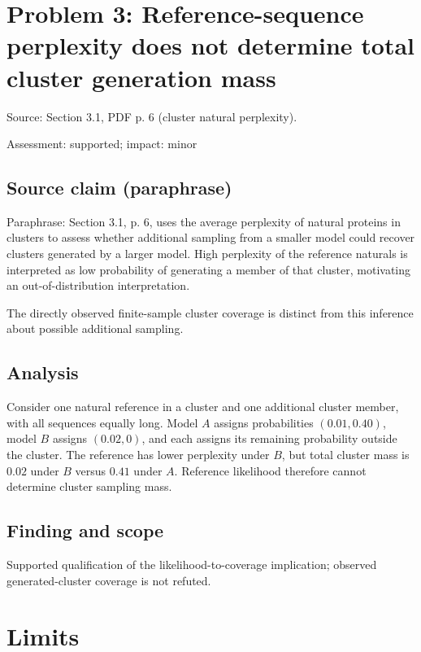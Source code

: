 \documentclass[11pt]{article}
\begin{document}
\section*{Problem 3: Reference-sequence perplexity does not determine total cluster generation mass}

Source: Section 3.1, PDF p. 6 (cluster natural perplexity).

Assessment: supported; impact: minor

\subsection*{Source claim (paraphrase)}

Paraphrase: Section 3.1, p. 6, uses the average perplexity of natural proteins in clusters to assess whether additional sampling from a smaller model could recover clusters generated by a larger model. High perplexity of the reference naturals is interpreted as low probability of generating a member of that cluster, motivating an out-of-distribution interpretation.

The directly observed finite-sample cluster coverage is distinct from this inference about possible additional sampling.

\subsection*{Analysis}

Consider one natural reference in a cluster and one additional cluster member, with all sequences equally long. Model \(A\) assigns probabilities \((0.01,0.40)\), model \(B\) assigns \((0.02,0)\), and each assigns its remaining probability outside the cluster. The reference has lower perplexity under \(B\), but total cluster mass is \(0.02\) under \(B\) versus \(0.41\) under \(A\). Reference likelihood therefore cannot determine cluster sampling mass.

\subsection*{Finding and scope}

Supported qualification of the likelihood-to-coverage implication; observed generated-cluster coverage is not refuted.

\section*{Limits}
\end{document}
